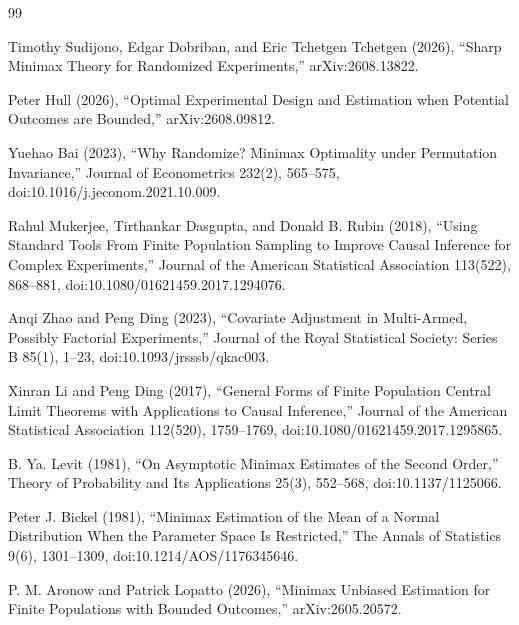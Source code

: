 \documentclass{article}
\begin{document}
\begin{thebibliography}{99}

   Timothy Sudijono, Edgar Dobriban, and Eric Tchetgen Tchetgen (2026), ``Sharp Minimax Theory for Randomized Experiments,'' arXiv:2608.13822.

   Peter Hull (2026), ``Optimal Experimental Design and Estimation when Potential Outcomes are Bounded,'' arXiv:2608.09812.

   Yuehao Bai (2023), ``Why Randomize? Minimax Optimality under Permutation Invariance,'' Journal of Econometrics 232(2), 565--575, doi:10.1016/j.jeconom.2021.10.009.

   Rahul Mukerjee, Tirthankar Dasgupta, and Donald B. Rubin (2018), ``Using Standard Tools From Finite Population Sampling to Improve Causal Inference for Complex Experiments,'' Journal of the American Statistical Association 113(522), 868--881, doi:10.1080/01621459.2017.1294076.

   Anqi Zhao and Peng Ding (2023), ``Covariate Adjustment in Multi-Armed, Possibly Factorial Experiments,'' Journal of the Royal Statistical Society: Series B 85(1), 1--23, doi:10.1093/jrsssb/qkac003.

   Xinran Li and Peng Ding (2017), ``General Forms of Finite Population Central Limit Theorems with Applications to Causal Inference,'' Journal of the American Statistical Association 112(520), 1759--1769, doi:10.1080/01621459.2017.1295865.

   B. Ya. Levit (1981), ``On Asymptotic Minimax Estimates of the Second Order,'' Theory of Probability and Its Applications 25(3), 552--568, doi:10.1137/1125066.

   Peter J. Bickel (1981), ``Minimax Estimation of the Mean of a Normal Distribution When the Parameter Space Is Restricted,'' The Annals of Statistics 9(6), 1301--1309, doi:10.1214/AOS/1176345646.

   P. M. Aronow and Patrick Lopatto (2026), ``Minimax Unbiased Estimation for Finite Populations with Bounded Outcomes,'' arXiv:2605.20572.

\end{thebibliography}
\end{document}
